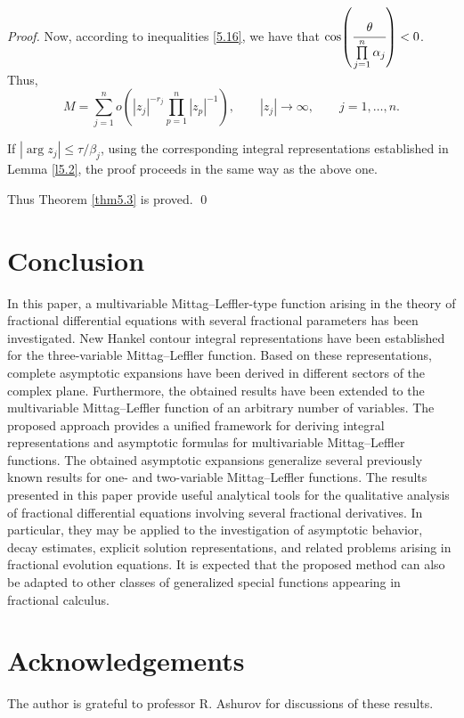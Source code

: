 \documentclass[12pt, reqno]{amsart}
\theoremstyle{definition}
\theoremstyle{remark}
\numberwithin{equation}{section}
\begin{document}
\begin{proof}
Now, according to inequalities \eqref{5.16}, we have that $\cos\!\left(\cfrac{\theta}{\prod\limits_{{j=1}}^n\alpha_j}\right)<0$. Thus,
\[
M=
\sum_{j=1}^{n}
o\!\left(
|z_j|^{-r_j}
\prod_{p=1}^{n}|z_p|^{-1}
\right),\qquad |z_j|\to\infty,\qquad j=1,\dots,n.
\]


If $ |\arg z_j| \leq \tau/\beta_j$, using the corresponding integral representations established in Lemma \ref{l5.2}, the proof proceeds in the same way as the above one.

Thus Theorem \ref{thm5.3} is proved. \qed
\end{proof}

\section{Conclusion}

In this paper, a multivariable Mittag--Leffler-type function arising in the theory of fractional differential equations with several fractional parameters has been investigated. New Hankel contour integral representations have been established for the three-variable Mittag--Leffler function. Based on these representations, complete asymptotic expansions have been derived in different sectors of the complex plane.
Furthermore, the obtained results have been extended to the multivariable Mittag--Leffler function of an arbitrary number of variables. The proposed approach provides a unified framework for deriving integral representations and asymptotic formulas for multivariable Mittag--Leffler functions. The obtained asymptotic expansions generalize several previously known results for one- and two-variable Mittag--Leffler functions.
The results presented in this paper provide useful analytical tools for the qualitative analysis of fractional differential equations involving several fractional derivatives. In particular, they may be applied to the investigation of asymptotic behavior, decay estimates, explicit solution representations, and related problems arising in fractional evolution equations. It is expected that the proposed method can also be adapted to other classes of generalized special functions appearing in fractional calculus.

\section*{Acknowledgements}

The author is grateful to professor R. Ashurov for discussions of these results. 
\end{document}
